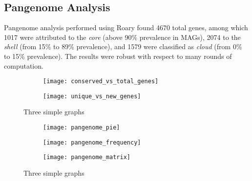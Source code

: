\subsection*{Pangenome Analysis}
\graphicspath{{images/pangenomeAnalysis}}





Pangenome analysis performed using Roary found 4670 total genes, 
among which 1017 were attributed to the \emph{core} (above 90\% prevalence in MAGs),
2074 to the \emph{shell} (from 15\% to 89\% prevalence), and 1579 were classified as \emph{cloud}
(from 0\% to 15\% prevalence). The results were robust with respect to many rounds of computation.



\begin{figure}[h]	%
     \centering
     \begin{subfigure}[b]{0.4\textwidth}
         \centering
         \texttt{[image: conserved\_vs\_total\_genes]}
         \caption{}
         \label{fig:conserved vs total}
     \end{subfigure}
     \hfill
     \begin{subfigure}[b]{0.4\textwidth}
         \centering
         \texttt{[image: unique\_vs\_new\_genes]}
         \caption{}
         \label{fig:unique vs new}
     \end{subfigure}
        \caption{Three simple graphs}
        \label{fig:three graphs}
\end{figure}


\begin{figure}[h]	%
     \centering
     \begin{subfigure}[b]{0.4\textwidth}
         \centering
         \texttt{[image: pangenome\_pie]}
         \caption{}
         \label{fig:pangenome pie}
     \end{subfigure}
     \hfill
     \begin{subfigure}[b]{0.4\textwidth}
         \centering
         \texttt{[image: pangenome\_frequency]}
         \caption{}
         \label{fig:pangeome frequency}
     \end{subfigure}
     \hfill
     \begin{subfigure}[b]{0.7\textwidth}
         \centering
         \texttt{[image: pangenome\_matrix]}
         \caption{}
         \label{fig:pangenome matrix}
     \end{subfigure}
        \caption{Three simple graphs}
        \label{fig:three graphs}
\end{figure}



